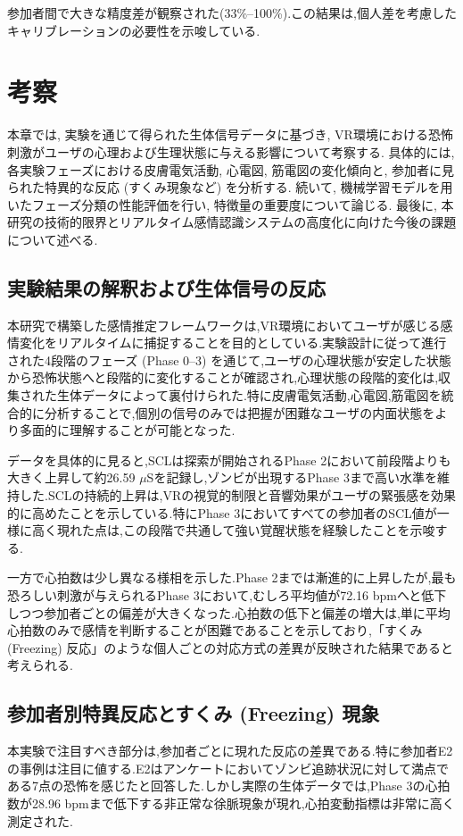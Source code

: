 \documentclass[book,paper=a4,fontsize=10pt,jafontscale=0.92]{jlreq}
\begin{document}
参加者間で大きな精度差が観察された(33\%--100\%).この結果は,個人差を考慮したキャリブレーションの必要性を示唆している.

\chapter{考察}
本章では, 実験を通じて得られた生体信号データに基づき, VR環境における恐怖刺激がユーザの心理および生理状態に与える影響について考察する. 具体的には, 各実験フェーズにおける皮膚電気活動, 心電図, 筋電図の変化傾向と, 参加者に見られた特異的な反応 (すくみ現象など) を分析する. 続いて, 機械学習モデルを用いたフェーズ分類の性能評価を行い, 特徴量の重要度について論じる. 最後に, 本研究の技術的限界とリアルタイム感情認識システムの高度化に向けた今後の課題について述べる.
\section{実験結果の解釈および生体信号の反応}
本研究で構築した感情推定フレームワークは,VR環境においてユーザが感じる感情変化をリアルタイムに捕捉することを目的としている.実験設計に従って進行された4段階のフェーズ (Phase 0--3) を通じて,ユーザの心理状態が安定した状態から恐怖状態へと段階的に変化することが確認され,心理状態の段階的変化は,収集された生体データによって裏付けられた.特に皮膚電気活動,心電図,筋電図を統合的に分析することで,個別の信号のみでは把握が困難なユーザの内面状態をより多面的に理解することが可能となった.

データを具体的に見ると,SCLは探索が開始されるPhase 2において前段階よりも大きく上昇して約26.59 $\mu$Sを記録し,ゾンビが出現するPhase 3まで高い水準を維持した.SCLの持続的上昇は,VRの視覚的制限と音響効果がユーザの緊張感を効果的に高めたことを示している.特にPhase 3においてすべての参加者のSCL値が一様に高く現れた点は,この段階で共通して強い覚醒状態を経験したことを示唆する.

一方で心拍数は少し異なる様相を示した.Phase 2までは漸進的に上昇したが,最も恐ろしい刺激が与えられるPhase 3において,むしろ平均値が72.16 bpmへと低下しつつ参加者ごとの偏差が大きくなった.心拍数の低下と偏差の増大は,単に平均心拍数のみで感情を判断することが困難であることを示しており,「すくみ (Freezing) 反応」のような個人ごとの対応方式の差異が反映された結果であると考えられる.

\section{参加者別特異反応とすくみ (Freezing) 現象}
本実験で注目すべき部分は,参加者ごとに現れた反応の差異である.特に参加者E2の事例は注目に値する.E2はアンケートにおいてゾンビ追跡状況に対して満点である7点の恐怖を感じたと回答した.しかし実際の生体データでは,Phase 3の心拍数が28.96 bpmまで低下する非正常な徐脈現象が現れ,心拍変動指標は非常に高く測定された.
\end{document}
